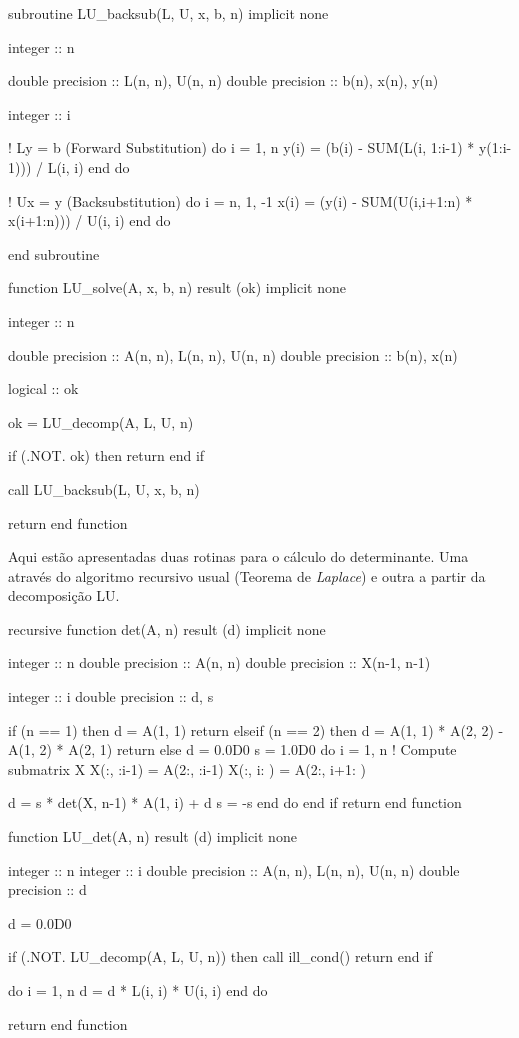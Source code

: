 \documentclass{homework}
\begin{document}
	\begin{fortran}
	subroutine LU_backsub(L, U, x, b, n)
		implicit none
		
		integer :: n
		
		double precision :: L(n, n), U(n, n)
		double precision :: b(n), x(n), y(n)
		
		integer :: i
		
	!   Ly = b (Forward Substitution)
		do i = 1, n
			y(i) = (b(i) - SUM(L(i, 1:i-1) * y(1:i-1))) / L(i, i)
		end do
		
	!   Ux = y (Backsubstitution)
		do i = n, 1, -1
			x(i) = (y(i) - SUM(U(i,i+1:n) * x(i+1:n))) / U(i, i)
		end do
	
	end subroutine
	
	function LU_solve(A, x, b, n) result (ok)
		implicit none
		
		integer :: n
		
		double precision :: A(n, n), L(n, n), U(n, n)
		double precision :: b(n), x(n)
		
		logical :: ok
		
		ok = LU_decomp(A, L, U, n)
		
		if (.NOT. ok) then
		return
		end if
		
		call LU_backsub(L, U, x, b, n)
		
		return
	end function
	\end{fortran}
	
	
	Aqui estão apresentadas duas rotinas para o cálculo do determinante. Uma através do algoritmo recursivo usual (Teorema de \textit{Laplace}) e outra a partir da decomposição LU.
	
	\begin{fortran}
	recursive function det(A, n) result (d)
		implicit none
		
		integer :: n
		double precision :: A(n, n)
		double precision :: X(n-1, n-1)
		
		integer :: i
		double precision :: d, s
		
		if (n == 1) then
			d = A(1, 1)
			return
		elseif (n == 2) then
			d = A(1, 1) * A(2, 2) - A(1, 2) * A(2, 1)
			return
		else
			d = 0.0D0
			s = 1.0D0
			do i = 1, n
	!           Compute submatrix X
				X(:,  :i-1) = A(2:,    :i-1)
				X(:, i:   ) = A(2:, i+1:   )
				
				d = s * det(X, n-1) * A(1, i) + d
				s = -s
			end do
		end if
		return
	end function
		
	function LU_det(A, n) result (d)
		implicit none
		
		integer :: n
		integer :: i
		double precision :: A(n, n), L(n, n), U(n, n)
		double precision :: d
		
		d = 0.0D0
		
		if (.NOT. LU_decomp(A, L, U, n)) then
			call ill_cond()
			return
		end if
		
		do i = 1, n
			d = d * L(i, i) * U(i, i)
		end do
		
		return
	end function
	\end{fortran}
	
\end{document}
